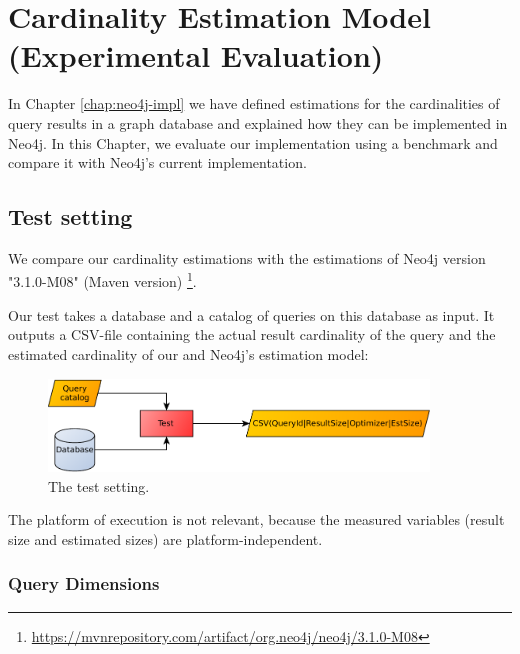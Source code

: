 \chapter{Cardinality Estimation Model (Experimental Evaluation)}

\begin{aboutchapter}
In Chapter \ref{chap:neo4j-impl} we have defined estimations for the
cardinalities of query results in a graph database and explained how they
can be implemented in Neo4j.
In this Chapter, we evaluate our implementation using a benchmark and
compare it with Neo4j's current implementation.
\end{aboutchapter}

\section{Test setting}

We compare our cardinality estimations with the estimations of Neo4j version
"3.1.0-M08" (Maven version)%
\footnote{\url{https://mvnrepository.com/artifact/org.neo4j/neo4j/3.1.0-M08}}.

Our test takes a database and a catalog of queries on this database as input.
It outputs a CSV-file containing the actual result cardinality of the query and
the estimated cardinality of our and Neo4j's estimation model:
\begin{figure}[H]
  \centering
  \includegraphics[width=0.9\textwidth]{figures/testbed.pdf}
  \caption{The test setting.}
  \label{fig:testbed}
\end{figure}

The platform of execution is not relevant, because the measured variables
(result size and estimated sizes) are platform-independent.

\subsection{Query Dimensions}
\label{sec:query-dimensions}

